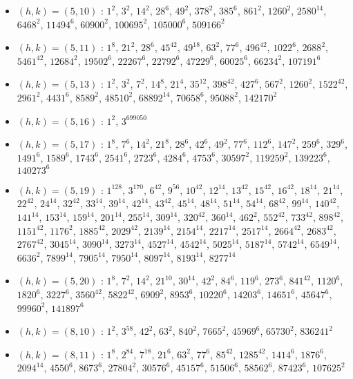 \begin{itemize}
\item $(h,k)=(5,10)$ : $1^{2}$, $3^{2}$, $14^{2}$, $28^{6}$, $49^{2}$, $378^{2}$, $385^{6}$, $861^{2}$, $1260^{2}$, $2580^{14}$, $6468^{2}$, $11494^{6}$, $60900^{2}$, $100695^{2}$, $105000^{6}$, $509166^{2}$
\item $(h,k)=(5,11)$ : $1^{8}$, $21^{2}$, $28^{6}$, $45^{42}$, $49^{18}$, $63^{2}$, $77^{6}$, $496^{42}$, $1022^{6}$, $2688^{2}$, $5461^{42}$, $12684^{2}$, $19502^{6}$, $22267^{6}$, $22792^{6}$, $47229^{6}$, $60025^{6}$, $66234^{2}$, $107191^{6}$
\item $(h,k)=(5,13)$ : $1^{2}$, $3^{2}$, $7^{2}$, $14^{8}$, $21^{4}$, $35^{12}$, $398^{42}$, $427^{6}$, $567^{2}$, $1260^{2}$, $1522^{42}$, $2961^{2}$, $4431^{6}$, $8589^{2}$, $48510^{2}$, $68892^{14}$, $70658^{6}$, $95088^{2}$, $142170^{2}$
\item $(h,k)=(5,16)$ : $1^{2}$, $3^{699050}$
\item $(h,k)=(5,17)$ : $1^{8}$, $7^{6}$, $14^{2}$, $21^{8}$, $28^{6}$, $42^{6}$, $49^{2}$, $77^{6}$, $112^{6}$, $147^{2}$, $259^{6}$, $329^{6}$, $1491^{6}$, $1589^{6}$, $1743^{6}$, $2541^{6}$, $2723^{6}$, $4284^{6}$, $4753^{6}$, $30597^{2}$, $119259^{2}$, $139223^{6}$, $140273^{6}$
\item $(h,k)=(5,19)$ : $1^{128}$, $3^{170}$, $6^{42}$, $9^{56}$, $10^{42}$, $12^{14}$, $13^{42}$, $15^{42}$, $16^{42}$, $18^{14}$, $21^{14}$, $22^{42}$, $24^{14}$, $32^{42}$, $33^{14}$, $39^{14}$, $42^{14}$, $43^{42}$, $45^{14}$, $48^{14}$, $51^{14}$, $54^{14}$, $68^{42}$, $99^{14}$, $140^{42}$, $141^{14}$, $153^{14}$, $159^{14}$, $201^{14}$, $255^{14}$, $309^{14}$, $320^{42}$, $360^{14}$, $462^{2}$, $552^{42}$, $733^{42}$, $898^{42}$, $1151^{42}$, $1176^{2}$, $1885^{42}$, $2029^{42}$, $2139^{14}$, $2154^{14}$, $2217^{14}$, $2517^{14}$, $2664^{42}$, $2683^{42}$, $2767^{42}$, $3045^{14}$, $3090^{14}$, $3273^{14}$, $4527^{14}$, $4542^{14}$, $5025^{14}$, $5187^{14}$, $5742^{14}$, $6549^{14}$, $6636^{2}$, $7899^{14}$, $7905^{14}$, $7950^{14}$, $8097^{14}$, $8193^{14}$, $8277^{14}$
\item $(h,k)=(5,20)$ : $1^{8}$, $7^{2}$, $14^{2}$, $21^{10}$, $30^{14}$, $42^{2}$, $84^{6}$, $119^{6}$, $273^{6}$, $841^{42}$, $1120^{6}$, $1820^{6}$, $3227^{6}$, $3560^{42}$, $5822^{42}$, $6909^{2}$, $8953^{6}$, $10220^{6}$, $14203^{6}$, $14651^{6}$, $45647^{6}$, $99960^{2}$, $141897^{6}$
\item $(h,k)=(8,10)$ : $1^{2}$, $3^{58}$, $42^{2}$, $63^{2}$, $840^{2}$, $7665^{2}$, $45969^{6}$, $65730^{2}$, $836241^{2}$
\item $(h,k)=(8,11)$ : $1^{8}$, $2^{84}$, $7^{18}$, $21^{6}$, $63^{2}$, $77^{6}$, $85^{42}$, $1285^{42}$, $1414^{6}$, $1876^{6}$, $2094^{14}$, $4550^{6}$, $8673^{6}$, $27804^{2}$, $30576^{6}$, $45157^{6}$, $51506^{6}$, $58562^{6}$, $87423^{6}$, $107625^{2}$

\end{itemize}
